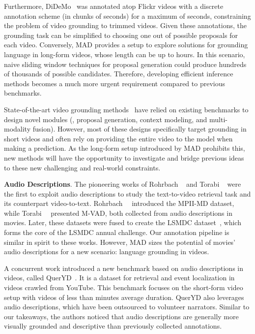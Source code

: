 \documentclass[10pt,twocolumn,letterpaper]{article}
\begin{document}
Furthermore, DiDeMo~\cite{Hendricks_2017_ICCV} was annotated atop Flickr videos with a discrete annotation scheme (\ie in chunks of  seconds) for a maximum of  seconds, constraining the problem of video grounding to trimmed videos. Given these annotations, the grounding task can be simplified to choosing one out of  possible proposals for each video. 
Conversely, MAD provides a setup to explore solutions for grounding language in long-form videos, whose length can be up to  hours.  
In this scenario, naive sliding window techniques for proposal generation could produce  hundreds of thousands of possible  candidates. Therefore, developing efficient inference methods becomes a much more urgent requirement compared to previous benchmarks.

State-of-the-art video grounding methods~\cite{2DTAN_2020_AAAI, soldan2021vlg, liu2020jointly, Zeng_2020_CVPR, Mun_2020_CVPR,Zhao_2021_CVPR,Liu_2021_CVPR} have relied on existing benchmarks to design novel modules (\ie, proposal generation, context modeling, and multi-modality fusion). However, most of these designs specifically target grounding in short videos and often rely on providing the entire video to the model when making a prediction. As the long-form setup introduced by MAD prohibits this, new methods will have the opportunity to investigate and bridge previous ideas to these new challenging and real-world  constraints.  


\noindent\textbf{Audio Descriptions}.
The pioneering works of Rohrbach \etal~\cite{rohrbach2015dataset} and Torabi \etal~\cite{torabi2015using} were the first to exploit audio descriptions to study the text-to-video retrieval task and its counterpart video-to-text. 
Rohrbach~\etal~\cite{rohrbach2015dataset} introduced the MPII-MD dataset, while Torabi~\etal~\cite{torabi2015using} presented M-VAD, both collected from audio descriptions in movies. Later, these datasets were fused to create the LSMDC dataset~\cite{rohrbach2017movie}, which forms the core of the LSMDC annual challenge. Our annotation pipeline is similar in spirit to these works. However, MAD sizes the potential of movies' audio descriptions for a new scenario: language grounding in videos.

A concurrent work introduced a new benchmark based on audio descriptions in videos, called QuerYD~\cite{9414640}. It is a dataset for retrieval and event localization in videos crawled from YouTube. This benchmark focuses on the short-form video setup with videos of less than  minutes average duration. QuerYD also leverages audio descriptions, which have been outsourced to volunteer narrators. Similar to our takeaways, the authors noticed that audio descriptions are generally more visually grounded and descriptive than previously collected annotations.
\end{document}

